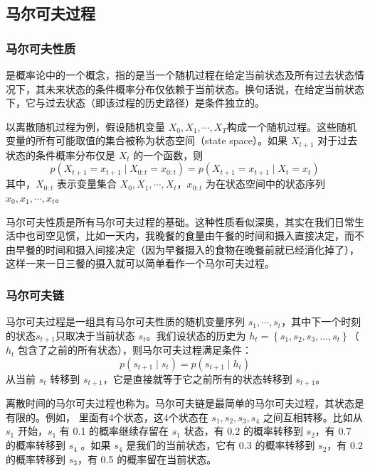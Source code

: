 \subsection{马尔可夫过程}
\subsubsection{马尔可夫性质}
是概率论中的一个概念，指的是当一个随机过程在给定当前状态及所有过去状态情况下，其未来状态的条件概率分布仅依赖于当前状态。换句话说，在给定当前状态下，它与过去状态（即该过程的历史路径）是条件独立的。

以离散随机过程为例，假设随机变量 $X_0,X_1,\cdots,X_T$构成一个随机过程。这些随机变量的所有可能取值的集合被称为状态空间（state space）。如果 $X_{t+1}$ 对于过去状态的条件概率分布仅是 $X_t$ 的一个函数，则
\begin{equation}
  \label{eq:}
  p\left(X_{t+1}=x_{t+1} \mid X_{0:t}=x_{0: t}\right)=p\left(X_{t+1}=x_{t+1} \mid X_{t}=x_{t}\right)
\end{equation}
其中，$X_{0:t}$ 表示变量集合 $X_{0}, X_{1}, \cdots, X_{t}$，$x_{0: t}$ 为在状态空间中的状态序列 $x_{0}, x_{1}, \cdots, x_{t}$。

马尔可夫性质是所有马尔可夫过程的基础。这种性质看似深奥，其实在我们日常生活中也司空见惯，比如一天内，我晚餐的食量由午餐的时间和摄入直接决定，而不由早餐的时间和摄入间接决定（因为早餐摄入的食物在晚餐前就已经消化掉了），这样一来一日三餐的摄入就可以简单看作一个马尔可夫过程。

\subsubsection{马尔可夫链}
马尔可夫过程是一组具有马尔可夫性质的随机变量序列 $s_1,\cdots,s_t$，其中下一个时刻的状态$s_{t+1}$只取决于当前状态 $s_t$。我们设状态的历史为 $h_{t}=\left\{s_{1}, s_{2}, s_{3}, \ldots, s_{t}\right\}$（$h_t$ 包含了之前的所有状态），则马尔可夫过程满足条件：
\begin{equation}
  \label{eq:}
  p\left(s_{t+1} \mid s_{t}\right) =p\left(s_{t+1} \mid h_{t}\right)
\end{equation}
从当前 $s_t$ 转移到 $s_{t+1}$，它是直接就等于它之前所有的状态转移到 $s_{t+1}$。

离散时间的马尔可夫过程也称为。马尔可夫链是最简单的马尔可夫过程，其状态是有限的。例如， 里面有4个状态，这4个状态在 $s_1,s_2,s_3,s_4$ 之间互相转移。比如从 $s_1$ 开始，$s_1$ 有 0.1 的概率继续存留在 $s_1$ 状态，有 0.2 的概率转移到 $s_2$，有 0.7 的概率转移到 $s_4$ 。如果 $s_4$ 是我们的当前状态，它有 0.3 的概率转移到 $s_2$，有 0.2 的概率转移到 $s_3$，有 0.5 的概率留在当前状态。

